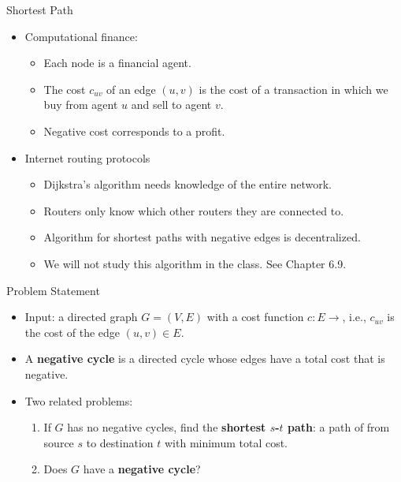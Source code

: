    \begin{frame}[fragile]{Shortest Path}

  \begin{itemize}
  \item Computational finance: 
    \begin{itemize}
    \item Each node is a financial agent.
    \item The cost $c_{uv}$ of an edge $(u, v)$ is the cost of a
      transaction in which we buy from agent $u$ and sell to agent $v$.
    \item Negative cost corresponds to a profit.
    \end{itemize}
  \item Internet routing protocols
    \begin{itemize}
    \item Dijkstra's algorithm needs knowledge of the entire network.
    \item Routers only know which other routers they are connected to.
    \item Algorithm for shortest paths with negative edges is decentralized.
    \item We will not study this algorithm in the class. See Chapter 6.9.
    \end{itemize} 
  \end{itemize} 
\end{frame}

   \begin{frame}[fragile]{Problem Statement} 

  \begin{itemize}
  \item Input: a directed graph $G = (V, E)$ with a cost function $c: E
    \rightarrow $, i.e., $c_{uv}$ is the cost of the edge $(u, v)
    \in E$.
  \item A \textbf{negative cycle} is a directed cycle whose edges have a
    total cost that is negative.
  \item Two related problems:
    \begin{enumerate}
    \item If $G$ has no negative cycles, find the \textbf{shortest
        $s$-$t$ path}: a path of from source $s$ to destination $t$ with
      minimum total cost.
    \item Does $G$ have a \textbf{negative cycle}?
    \end{enumerate}
  \end{itemize}
   

\end{frame}

